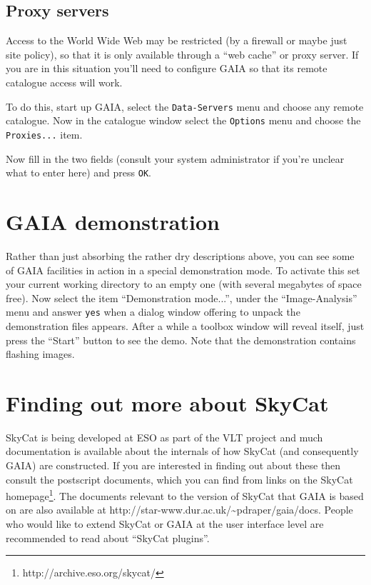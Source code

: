 \documentclass[twoside,11pt]{article}
\newcommand{\htmladdnormallinkfoot}[2]{#1\footnote{#2}}
\newcommand{\htmladdnormallink}[2]{#1}
\newcommand{\xlabel}[1]{}
\renewcommand{\_}{\texttt{\symbol{95}}}
\newcommand{\mytt}[1]{{\texttt{#1}}}
\begin{document}
\subsection{\xlabel{proxy_servers}Proxy servers}
Access to the World Wide Web may be restricted (by a firewall or maybe
just site policy), so that it is only available through a ``web
cache'' or proxy server. If you are in this situation you'll need to
configure GAIA so that its remote catalogue access will work.

To do this, start up GAIA, select the \mytt{Data-Servers} menu and
choose any remote catalogue. Now in the catalogue window select the
\mytt{Options} menu and choose the \mytt{Proxies...} item.

Now fill in the two fields (consult your system administrator if you're
unclear what to enter here) and press \mytt{OK}.

\section{\xlabel{gaia_demonstration}GAIA demonstration}
Rather than just absorbing the rather dry descriptions above, you can
see some of GAIA facilities in action in a special demonstration
mode. To activate this set your current working directory to an empty
one (with several megabytes of space free). Now select the item
``Demonstration mode...'', under the ``Image-Analysis'' menu and
answer \mytt{yes} when a dialog window offering to unpack the
demonstration files appears. After a while a toolbox window will
reveal itself, just press the ``Start'' button to see the demo. Note
that the demonstration contains flashing images.

\section{\xlabel{finding_out_more_about_skycat}Finding out more about SkyCat}
\htmladdnormallink{SkyCat}{http://archive.eso.org/skycat/} is being
developed at \htmladdnormallink{ESO}{http://www.eso.org/} as part of
the \htmladdnormallink{VLT}{http://www.eso.org/vlt/} project and much
documentation is available about the internals of how SkyCat (and
consequently GAIA) are constructed. If you are interested in finding
out about these then consult the postscript documents, which you can
find from links on the \htmladdnormallinkfoot{SkyCat
homepage}{http://archive.eso.org/skycat/}. The documents relevant to
the version of SkyCat that GAIA is based on are also available at
\htmladdnormallink{http://star-www.dur.ac.uk/\~{}pdraper/gaia/docs}
{http://star-www.dur.ac.uk/~pdraper/gaia/docs}. People who would like
to extend SkyCat or GAIA at the user interface level are recommended
to read about ``SkyCat plugins''.
\end{document}

